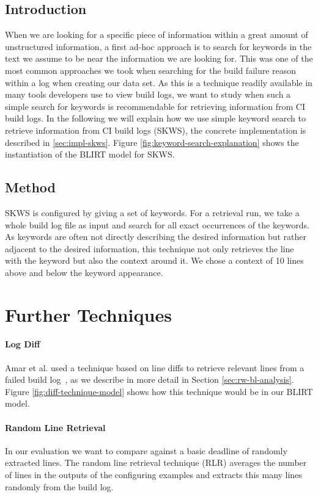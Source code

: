 \documentclass[\myrootdir/main.tex]{subfiles}
\begin{document}
\subsection{Introduction}
When we are looking for a specific piece of information within a great amount of unstructured information, a first ad-hoc approach is to search for keywords in the text we assume to be near the information we are looking for.
This was one of the most common approaches we took when searching for the build failure reason within a log when creating our data set.
As this is a technique readily available in many tools developers use to view build logs, we want to study when such a simple search for keywords is recommendable for retrieving information from CI build logs.
In the following we will explain how we use simple keyword search to retrieve information from CI build logs (SKWS), the concrete implementation is described in \ref{sec:impl-skws}.
Figure \ref{fig:keyword-search-explanation} shows the instantiation of the BLIRT model for SKWS.

\subsection{Method}
SKWS is configured by giving a set of keywords.
For a retrieval run, we take a whole build log file as input and search for all exact occurrences of the keywords.
As keywords are often not directly describing the desired information but rather adjacent to the desired information, this technique not only retrieves the line with the keyword but also the context around it.
We chose a context of 10 lines above and below the keyword appearance.

\section{Further Techniques}
\label{sec:expl-rlr}

\paragraph{Log Diff}
Amar et al. used a technique based on line diffs to retrieve relevant lines from a failed build log~\cite{amar2019mining}, as we describe in more detail in Section \ref{sec:rw-bl-analysis}.
Figure \ref{fig:diff-technique-model} shows how this technique would be in our BLIRT model.
\paragraph{Random Line Retrieval}
In our evaluation we want to compare against a basic deadline of randomly extracted lines.
The random line retrieval technique (RLR) averages the number of lines in the outputs of the configuring examples and extracts this many lines randomly from the build log.
\end{document}

